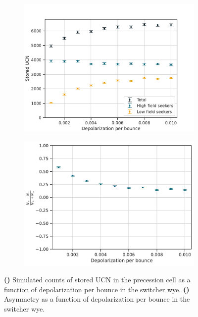 \begin{figure}
\centering
\begin{subfigure}{.5\textwidth} 
  \centering
  \includegraphics[width=\textwidth]{figures/stored_ucn.pdf}
  \vspace{0pt}
  \caption{}\label{subfig:pentrack_north_beamline_stored_counts}
\end{subfigure}%
\begin{subfigure}{.5\textwidth}
  \centering
  \includegraphics[width=\textwidth]{figures/storage_spin_contrast.pdf}
  \vspace{-7pt}
  \caption{}\label{subfig:pentrack_north_beamline_stored_asymmetry}
\end{subfigure}
\caption
    {\textbf{()} Simulated counts of stored UCN in the precession cell as a function of depolarization per bounce in the switcher wye. \textbf{()} Asymmetry as a function of depolarization per bounce  in the switcher wye.}
\label{fig:pentrack_north_beamline_stored}
\end{figure}

